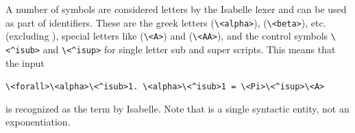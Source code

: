 \begin{isabellebody}
\begin{isamarkuptext}
  A number of symbols are considered letters by the Isabelle lexer and
  can be used as part of identifiers. These are the greek letters
   (\verb+\+\verb+<alpha>+), 
  (\verb+\+\verb+<beta>+), etc. (excluding ),
  special letters like  (\verb+\+\verb+<A>+) and  (\verb+\+\verb+<AA>+), and the control symbols
  \verb+\+\verb+<^isub>+ and \verb+\+\verb+<^isup>+ for single letter
  sub and super scripts. This means that the input

  \medskip
  {\small\noindent \verb,\,\verb,<forall>\,\verb,<alpha>\<^isub>1.,~\verb,\,\verb,<alpha>\<^isub>1 = \,\verb,<Pi>\<^isup>\<A>,}

  \medskip
  \noindent is recognized as the term  
  by Isabelle. Note that  is a single
  syntactic entity, not an exponentiation.


\end{isamarkuptext}
\end{isabellebody}

